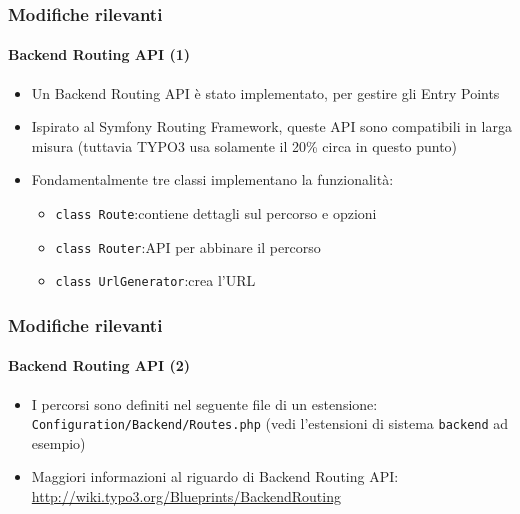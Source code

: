 \begin{frame}[fragile]
	\frametitle{Modifiche rilevanti}
	\framesubtitle{Backend Routing API (1)}

	\begin{itemize}
		\item Un Backend Routing API è stato implementato, per gestire gli Entry Points
		\item Ispirato al Symfony Routing Framework, queste API sono compatibili in larga misura\newline
			\small(tuttavia TYPO3 usa solamente il 20\% circa in questo punto)\normalsize

		\item Fondamentalmente tre classi implementano la funzionalità:
			\begin{itemize}
				\item \texttt{class Route}:\tabto{3.6cm}contiene dettagli sul percorso e opzioni
				\item \texttt{class Router}:\tabto{3.6cm}API per abbinare il percorso
				\item \texttt{class UrlGenerator}:\tabto{3.6cm}crea l'URL
			\end{itemize}
	\end{itemize}

\end{frame}

\begin{frame}[fragile]
	\frametitle{Modifiche rilevanti}
	\framesubtitle{Backend Routing API (2)}

	\begin{itemize}

		\item I percorsi sono definiti nel seguente file di un estensione:
			\texttt{Configuration/Backend/Routes.php}\newline
			(vedi l'estensioni di sistema \texttt{backend} ad esempio)

		\item Maggiori informazioni al riguardo di Backend Routing API:\newline
			\small\url{http://wiki.typo3.org/Blueprints/BackendRouting}\normalsize

	\end{itemize}

\end{frame}

